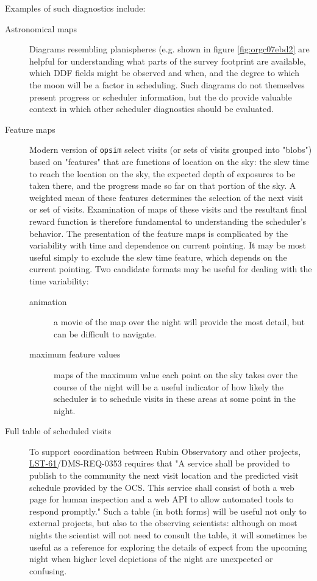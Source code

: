 Examples of such diagnostics include:
\begin{description}
\item[{Astronomical maps}] Diagrams resembling planispheres (e.g. shown in figure \ref{fig:orgc07ebd2} are helpful for understanding what parts of the survey footprint are available, which DDF fields might be observed and when, and the degree to which the moon will be a factor in scheduling. Such diagrams do not themselves present progress or scheduler information, but the do provide valuable context in which other scheduler diagnostics should be evaluated.
\item[{Feature maps}] Modern version of \texttt{opsim} select visits (or sets of visits grouped into "blobs") based on "features" that are functions of location on the sky: the slew time to reach the location on the sky, the expected depth of exposures to be taken there, and the progress made so far on that portion of the sky. A weighted mean of these features determines the selection of the next visit or set of visits. Examination of maps of these visits and the resultant final reward function is therefore fundamental to understanding the scheduler's behavior. The presentation of the feature maps is complicated by the variability with time and dependence on current pointing. It may be most useful simply to exclude the slew time feature, which depends on the current pointing. Two candidate formats may be useful for dealing with the time variability:
\begin{description}
\item[{animation}] a movie of the map over the night will provide the most detail, but can be difficult to navigate.
\item[{maximum feature values}] maps of the maximum value each point on the sky takes over the course of the night will be a useful indicator of how likely the scheduler is to schedule visits in these areas at some point in the night.
\end{description}
\item[{Full table of scheduled visits}] To support coordination between Rubin Observatory and other projects, \href{https://ls.st/lse-61}{LST-61}/DMS-REQ-0353 requires that "A service shall be provided to publish to the community the next visit location and the predicted visit schedule provided by the OCS. This service shall consist of both a web page for human inspection and a web API to allow automated tools to respond promptly." Such a table (in both forms) will be useful not only to external projects, but also to the observing scientists: although on most nights the scientist will not need to consult the table, it will sometimes be useful as a reference for exploring the details of expect from the upcoming night when higher level depictions of the night are unexpected or confusing.

\end{description}
